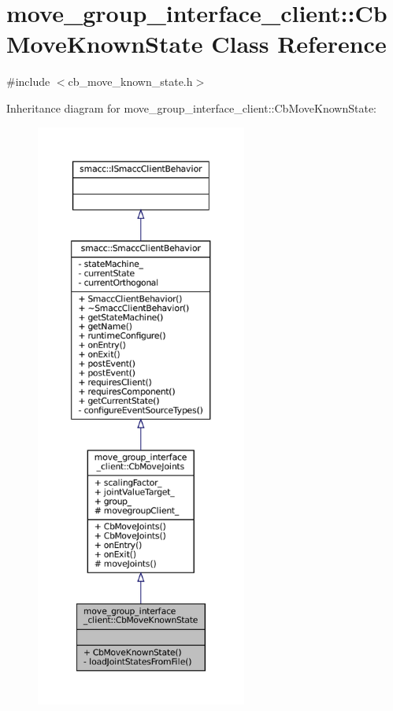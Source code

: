 \hypertarget{classmove__group__interface__client_1_1CbMoveKnownState}{}\section{move\+\_\+group\+\_\+interface\+\_\+client\+:\+:Cb\+Move\+Known\+State Class Reference}
\label{classmove__group__interface__client_1_1CbMoveKnownState}


{\ttfamily \#include $<$cb\+\_\+move\+\_\+known\+\_\+state.\+h$>$}



Inheritance diagram for move\+\_\+group\+\_\+interface\+\_\+client\+:\+:Cb\+Move\+Known\+State\+:
\nopagebreak
\begin{figure}[H]
\begin{center}
\leavevmode
\includegraphics[height=550pt]{classmove__group__interface__client_1_1CbMoveKnownState__inherit__graph}
\end{center}
\end{figure}


